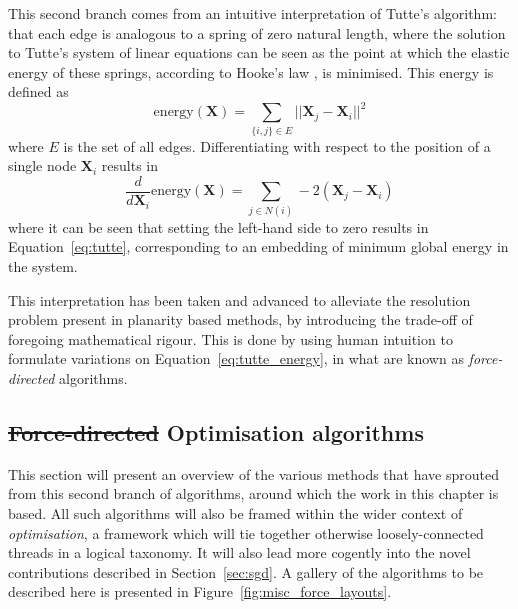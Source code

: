 This second branch comes from an intuitive interpretation of Tutte's algorithm: that each edge is analogous to a spring of zero natural length, where the solution to Tutte's system of linear equations can be seen as the point at which the elastic energy of these springs, according to Hooke's law \cite{Hooke1678}, is minimised. This energy is defined as
\begin{equation}
  \mathrm{energy}(\mathbf{X}) = \sum_{\{i,j\}\in E}||\mathbf{X}_j-\mathbf{X}_i||^2
\label{eq:tutte_energy}
\end{equation}
where $E$ is the set of all edges. Differentiating with respect to the position of a single node $\mathbf{X}_i$ results in
\begin{equation}
  \frac{d}{d\mathbf{X}_i}\mathrm{energy}(\mathbf{X}) = \sum_{j\in N(i)}-2(\mathbf{X}_j-\mathbf{X}_i)
\label{eq:tutte_force}
\end{equation}
where it can be seen that setting the left-hand side to zero results in Equation~\eqref{eq:tutte}, corresponding to an embedding of minimum global energy in the system.

This interpretation has been taken and advanced to alleviate the resolution problem present in planarity based methods, by introducing the trade-off of foregoing mathematical rigour. 
This is done by using human intuition to formulate variations on Equation~\eqref{eq:tutte_energy}, in what are known as \emph{force-directed} algorithms.

\subsection{\texorpdfstring{\st{Force-directed}{ Optimisation algorithms}}{}}
\label{sec:force_background}
This section will present an overview of the various methods that have sprouted from this second branch of algorithms, around which the work in this chapter is based. All such algorithms will also be framed within the wider context of \emph{optimisation}, a framework which will tie together otherwise loosely-connected threads in a logical taxonomy.
It will also lead more cogently into the novel contributions described in Section~\ref{sec:sgd}.
A gallery of the algorithms to be described here is presented in Figure~\ref{fig:misc_force_layouts}.

